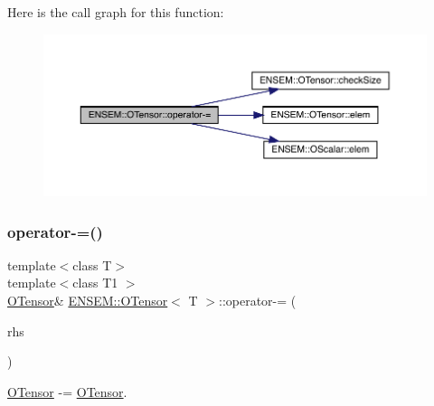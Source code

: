 Here is the call graph for this function\+:
\nopagebreak
\begin{figure}[H]
\begin{center}
\leavevmode
\includegraphics[width=350pt]{da/d8a/classENSEM_1_1OTensor_a61ebd11eac882623ea080293b007972b_cgraph}
\end{center}
\end{figure}
\mbox{\label{classENSEM_1_1OTensor_a8a087d8889bb41eafd237e270e4182fa}} 
\subsubsection{\texorpdfstring{operator-\/=()}{operator-=()}\hspace{0.1cm}{\footnotesize\ttfamily [4/6]}}
{\footnotesize\ttfamily template$<$class T$>$ \\
template$<$class T1 $>$ \\
\mbox{\hyperlink{classENSEM_1_1OTensor}{O\+Tensor}}\& \mbox{\hyperlink{classENSEM_1_1OTensor}{E\+N\+S\+E\+M\+::\+O\+Tensor}}$<$ T $>$\+::operator-\/= (\begin{DoxyParamCaption}\item[{const \mbox{\hyperlink{classENSEM_1_1OTensor}{O\+Tensor}}$<$ T1 $>$ \&}]{rhs }\end{DoxyParamCaption})\hspace{0.3cm}{\ttfamily [inline]}}



\mbox{\hyperlink{classENSEM_1_1OTensor}{O\+Tensor}} -\/= \mbox{\hyperlink{classENSEM_1_1OTensor}{O\+Tensor}}. 

